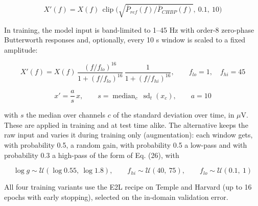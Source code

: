 \documentclass[11pt,a4paper]{article}
\begin{document}
\begin{equation}
X'(f) = X(f)\,\operatorname{clip}\Big( \sqrt{ \bar P_{ref}(f) / \bar P_{CHBP}(f) },\ 0.1,\ 10 \Big) \tag{25}
\end{equation}

In training, the model input is band-limited to 1--45 Hz with order-8 zero-phase Butterworth responses and, optionally, every 10 s window is scaled to a fixed amplitude:

\begin{equation}
X'(f) = X(f)\,\frac{(f/f_{lo})^{16}}{1 + (f/f_{lo})^{16}}\,\frac{1}{1 + (f/f_{hi})^{16}}, \qquad f_{lo} = 1, \quad f_{hi} = 45 \tag{26}
\end{equation}

\begin{equation}
x' = \frac{a}{s}\,x, \qquad s = \operatorname{median}_c\ \operatorname{sd}_t(x_c), \qquad a = 10 \tag{27}
\end{equation}

with $s$ the median over channels $c$ of the standard deviation over time, in $\mu$V. These are applied in training and at test time alike. The alternative keeps the raw input and varies it during training only (augmentation): each window gets, with probability 0.5, a random gain, with probability 0.5 a low-pass and with probability 0.3 a high-pass of the form of Eq. (26), with

\begin{equation}
\log g \sim \mathcal{U}(\log 0.55,\ \log 1.8), \qquad f_{hi} \sim \mathcal{U}(40,\ 75), \qquad f_{lo} \sim \mathcal{U}(0.1,\ 1) \tag{28}
\end{equation}

All four training variants use the E2L recipe on Temple and Harvard (up to 16 epochs with early stopping), selected on the in-domain validation error.
\end{document}
